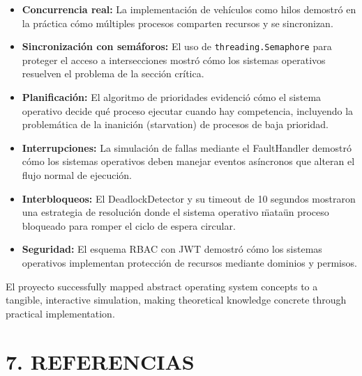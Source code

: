 \documentclass[12pt,a4paper]{article}
\begin{document}
\begin{itemize}
    \item \textbf{Concurrencia real:} La implementación de vehículos como hilos demostró en la práctica cómo múltiples procesos comparten recursos y se sincronizan.
    
    \item \textbf{Sincronización con semáforos:} El uso de \texttt{threading.Semaphore} para proteger el acceso a intersecciones mostró cómo los sistemas operativos resuelven el problema de la sección crítica.
    
    \item \textbf{Planificación:} El algoritmo de prioridades evidenció cómo el sistema operativo decide qué proceso ejecutar cuando hay competencia, incluyendo la problemática de la inanición (starvation) de procesos de baja prioridad.
    
    \item \textbf{Interrupciones:} La simulación de fallas mediante el FaultHandler demostró cómo los sistemas operativos deben manejar eventos asíncronos que alteran el flujo normal de ejecución.
    
    \item \textbf{Interbloqueos:} El DeadlockDetector y su timeout de 10 segundos mostraron una estrategia de resolución donde el sistema operativo \"mata\" un proceso bloqueado para romper el ciclo de espera circular.
    
    \item \textbf{Seguridad:} El esquema RBAC con JWT demostró cómo los sistemas operativos implementan protección de recursos mediante dominios y permisos.
\end{itemize}

El proyecto successfully mapped abstract operating system concepts to a tangible, interactive simulation, making theoretical knowledge concrete through practical implementation.

\newpage

\section{7. REFERENCIAS}
\end{document}

